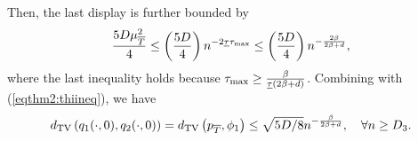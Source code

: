 \documentclass[twoside,11pt]{article}
\newcommand{\bbE}{{\mathbb E}}
\newcommand{\be}{\begin{equation}}
\newcommand{\ee}{\end{equation}}
\newcommand{\bean}{\setlength\arraycolsep{1pt}\begin{eqnarray*}}
\newcommand{\eean}{\end{eqnarray*}}
\begin{document}
Then, the last display is further bounded by
\bean
\frac{5 D \mu_{\overline{T}}^2 }{4}
\leq \left( \frac{5D}{4} \right)  n^{ - 2 \underline{\tau} \tau_{\rm max}}
\leq \left( \frac{5 D}{4} \right) n^{-\frac{2\beta}{2\beta + d}}, 
\eean
where the last inequality holds because $\tau_{\rm max} \geq \frac{\beta}{\underline{\tau} (2\beta + d)}$.
Combining with (\ref{eqthm2:thiineq}), we have
\be
d_{\rm TV} \left( q_{1}(\cdot, 0),  q_{2}(\cdot, 0)  \right) 
= d_{\rm TV} \left( p_{\overline{T}}, \phi_1 \right)   \leq \sqrt{5D/8} n^{-\frac{\beta}{2\beta + d}},
\quad \forall n \geq D_{3}.
\label{eqthm2:thibd}
\ee


\end{document}
